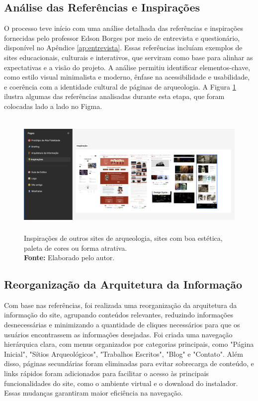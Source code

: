 \subsection{Análise das Referências e Inspirações}
O processo teve início com uma análise detalhada das referências e inspirações fornecidas pelo professor Edson Borges por meio de entrevista e questionário, disponível no Apêndice \ref{ap:entrevista}. Essas referências incluíam exemplos de sites educacionais, culturais e interativos, que serviram como base para alinhar as expectativas e a visão do projeto. A análise permitiu identificar elementos-chave, como estilo visual minimalista e moderno, ênfase na acessibilidade e usabilidade, e coerência com a identidade cultural de páginas de arqueologia. A Figura \ref{fig:inpirações} ilustra algumas das referências analisadas durante esta etapa, que foram colocadas lado a lado no Figma.

\begin{figure}[H]
    \centering
    \includegraphics[height=6cm, keepaspectratio]{img/Protótipo/inspiração.png}
    \caption{ Inspirações de outros sites de arqueologia, sites com boa estética, \\ paleta de cores ou forma atrativa. \\
        \textbf{Fonte:} Elaborado pelo autor.}
    \label{fig:inpirações}
\end{figure}

\subsection{Reorganização da Arquitetura da Informação}
Com base nas referências, foi realizada uma reorganização da arquitetura da informação do site, agrupando conteúdos relevantes, reduzindo informações desnecessárias e minimizando a quantidade de cliques necessários para que os usuários encontrassem as informações desejadas. Foi criada uma navegação hierárquica clara, com menus organizados por categorias principais, como "Página Inicial", "Sítios Arqueológicos", "Trabalhos Escritos", "Blog" e "Contato". Além disso, páginas secundárias foram eliminadas para evitar sobrecarga de conteúdo, e links rápidos foram adicionados para facilitar o acesso às principais funcionalidades do site, como o ambiente virtual e o download do instalador. Essas mudanças garantiram maior eficiência na navegação.

